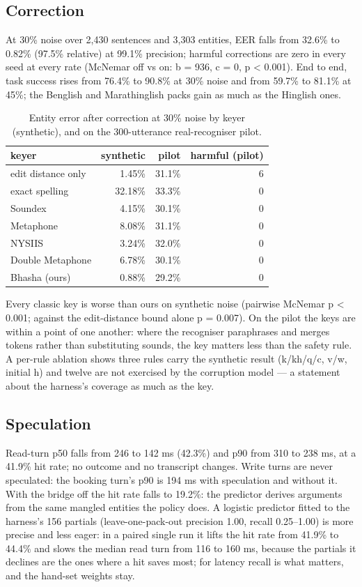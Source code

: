 \documentclass[conference]{IEEEtran}
\begin{document}
\subsection{Correction}

At 30\% noise over 2,430 sentences and 3,303 entities, EER falls from 32.6\% to 0.82\% (97.5\% relative) at 99.1\% precision; harmful corrections are zero in every seed at every rate (McNemar off vs on: b = 936, c = 0, p < 0.001). End to end, task success rises from 76.4\% to 90.8\% at 30\% noise and from 59.7\% to 81.1\% at 45\%; the Benglish and Marathinglish packs gain as much as the Hinglish ones.

\begin{table}[t]
\caption{Entity error after correction at 30\% noise by keyer (synthetic), and on the 300-utterance real-recogniser pilot.}
\label{tab:I}
\centering\small
\begin{tabular}{lrrr}
\toprule
keyer & synthetic & pilot & harmful (pilot) \\
\midrule
edit distance only & 1.45\% & 31.1\% & 6 \\
exact spelling & 32.18\% & 33.3\% & 0 \\
Soundex & 4.15\% & 30.1\% & 0 \\
Metaphone & 8.08\% & 31.1\% & 0 \\
NYSIIS & 3.24\% & 32.0\% & 0 \\
Double Metaphone & 6.78\% & 30.1\% & 0 \\
Bhasha (ours) & 0.88\% & 29.2\% & 0 \\
\bottomrule
\end{tabular}
\end{table}

Every classic key is worse than ours on synthetic noise (pairwise McNemar p < 0.001; against the edit-distance bound alone p = 0.007). On the pilot the keys are within a point of one another: where the recogniser paraphrases and merges tokens rather than substituting sounds, the key matters less than the safety rule. A per-rule ablation shows three rules carry the synthetic result (k/kh/q/c, v/w, initial h) and twelve are not exercised by the corruption model --- a statement about the harness's coverage as much as the key.

\subsection{Speculation}

Read-turn p50 falls from 246 to 142 ms (42.3\%) and p90 from 310 to 238 ms, at a 41.9\% hit rate; no outcome and no transcript changes. Write turns are never speculated: the booking turn's p90 is 194 ms with speculation and without it. With the bridge off the hit rate falls to 19.2\%: the predictor derives arguments from the same mangled entities the policy does. A logistic predictor fitted to the harness's 156 partials (leave-one-pack-out precision 1.00, recall 0.25--1.00) is more precise and less eager: in a paired single run it lifts the hit rate from 41.9\% to 44.4\% and slows the median read turn from 116 to 160 ms, because the partials it declines are the ones where a hit saves most; for latency recall is what matters, and the hand-set weights stay.
\end{document}

